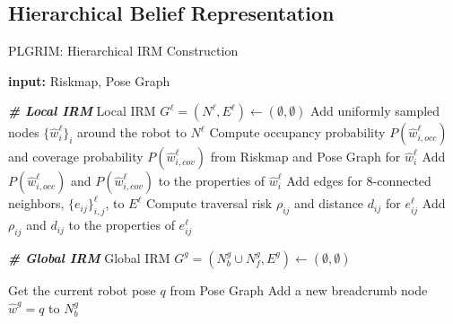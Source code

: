 \documentclass[letterpaper]{article} %
\begin{document}
\subsection{Hierarchical Belief Representation} \label{ssec:belief-managers}
\begin{algorithm}[t!]
{\fontsize{7.8pt}{8.6pt}\selectfont
\caption{PLGRIM: Hierarchical IRM Construction}
\label{alg:IRMs}
\begin{algorithmic}
  \STATE \textbf{input:} Riskmap, Pose Graph %

  \vspace{3pt}
  \STATE \textbf{\textit{\# Local IRM}}
  \STATE Local IRM $G^\ell = (N^\ell, E^\ell) \gets (\emptyset, \emptyset)$
  \STATE Add uniformly sampled nodes $\{\hat{w}^\ell_i\}_i$ around the robot to $N^\ell$
    \STATE Compute occupancy probability $P(\hat{w}^\ell_{i,occ})$ and coverage probability $P(\hat{w}^\ell_{i,cov})$ from Riskmap and Pose Graph for $\hat{w}^\ell_i$
    \STATE Add $P(\hat{w}^\ell_{i,occ})$ and $P(\hat{w}^\ell_{i,cov})$ to the properties of $\hat{w}^\ell_i$
  \ENDFOR
  \STATE Add edges for 8-connected neighbors, $\{e_{ij}\}^\ell_{i,j}$, to $E^\ell$
    \STATE Compute traversal risk $\rho_{ij}$ and distance $d_{ij}$ for $e^\ell_{ij}$
    \STATE Add $\rho_{ij}$ and $d_{ij}$ to the properties of $e^\ell_{ij}$
  \ENDFOR

  \vspace{3pt}
  \STATE \textbf{\textit{\# Global IRM}}
    \STATE Global IRM $G^g = (N^g_b \cup N^g_f, E^g) \gets (\emptyset, \emptyset)$
  \ENDIF
  
  \STATE Get the current robot pose $q$ from Pose Graph
    \STATE Add a new breadcrumb node $\hat{w}^g = q$ to $N^g_b$
  \ENDIF



\end{algorithmic}}
\end{algorithm}
\end{document}
